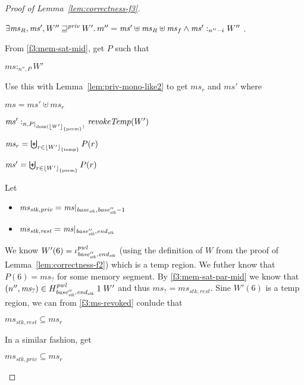 \documentclass[a4paper]{article}
\DeclarePairedDelimiter\floor{\lfloor}{\rfloor}
\DeclareMathOperator{\dom}{dom}
\newcommand{\var}[1]{\mathit{#1}}
\newcommand{\hs}{\var{ms}}
\newcommand{\ms}{\hs}
\newcommand{\start}{\var{base}}
\newcommand{\addrend}{\var{end}}
\newcommand{\heap}{\var{mem}}
\newcommand{\stk}{\var{stk}}
\newcommand{\pwl}{\var{pwl}}
\newcommand{\plainfun}[2]{
  \ifthenelse{\equal{#2}{}}
  {\mathit{#1}}
  {\mathit{#1}(#2)}
}
\newcommand{\revokeTemp}[1]{\plainfun{revokeTemp}{#1}}
\newcommand{\erase}[2]{\floor*{#1}_{\{#2\}}}
\newcommand{\futurestr}{\mathbin{\sqsupseteq}^{\var{priv}}}
\newcommand{\heapSat}[3][\heap]{#1 :_{#2} #3}
\newcommand{\memSatPar}[4][n]{\heapSat[#2]{#1 , #4}{#3}}
\newcommand{\npair}[2][n]{\left(#1,#2 \right)}
\newcommand{\plainview}[1]{\mathrm{#1}}
\newcommand{\perma}{\plainview{perm}}
\newcommand{\temp}{\plainview{temp}}
\begin{document}
\begin{lemma}
\begin{proof}[Proof of Lemma~\ref{lem:correctness-f3}]
\begin{enumproof}[start=3]
\begin{enumproof}[start=3]
      \begin{enumproof}
      \item $\exists \ms_R,\ms', W'' \futurestr W' \ldotp m'' = \ms' \uplus \ms_R \uplus \ms_f \land \heapSat[\ms']{n''-i}{W''}$ \label{f3:proof-burden}.
      \end{enumproof}
      From \ref{f3:mem-sat-mid}, get $P$ such that 
      \begin{enumproof}[resume]
      \item $\memSatPar[n'']{\ms}{W'}{P}$ \label{f3:mem-sat-par-mid}
      \end{enumproof}
      Use this with Lemma~\ref{lem:priv-mono-like2} to get $\ms_r$ and $\ms'$ where
      \begin{enumproof}[resume]
      \item $\ms = \ms' \uplus \ms_r$
      \item $\memSatPar{\ms'}{\revokeTemp{W'}}{P|_{\dom(\erase{W'}{\perma})}}$ \label{f3:perm-mem-sat}
      \item $\ms_r = \biguplus_{r \in \erase{W'}{\temp}} P(r)$ \label{f3:ms-revoked}
      \item $\ms' = \biguplus_{r \in \erase{W'}{\perma}} P(r)$
      \end{enumproof}
      Let
      \begin{itemize}
      \item $\ms_{\stk,\var{priv}} = \ms |_{\start_\stk,\base_\stk''-1}$
      \item $\ms_{\stk,\var{rest}} = \ms |_{\base_\stk'',\addrend_\stk}$
      \end{itemize}
      We know $W'(6)=\iota^\pwl_{\base_\stk'',\addrend_\stk}$ (using the definition of $W$ from the proof of Lemma~\ref{lem:correctness-f2}) which is a $\temp$ region. We futher know that $P(6) = \ms_{\var{?}}$ for some memory segment. By \ref{f3:mem-sat-par-mid} we know that $\npair[n'']{\ms_?} \in H^\pwl_{\base_\stk'',\addrend_\stk} \; 1 \; W'$ and thus $\ms_? = \ms_{\stk,\var{rest}}$. Sine $W'(6)$ is a $\temp$ region, we can from \ref{f3:ms-revoked} conlude that 
      \begin{enumproof}[resume]
      \item $\ms_{\stk,\var{rest}} \subseteq \ms_r$
      \end{enumproof}
      In a similar fashion, get
      \begin{enumproof}[resume]
      \item $\ms_{\stk,\var{priv}} \subseteq \ms_r$
      \end{enumproof}


\end{enumproof}
\end{enumproof}
\end{proof}
\end{lemma}
\end{document}
